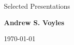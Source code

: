 \documentclass[
]{resume2} %
\begin{document}

\begin{center}
{\Large Selected Presentations}

{\large \textbf{Andrew S. Voyles}}

\today
\end{center} 

\end{document}
